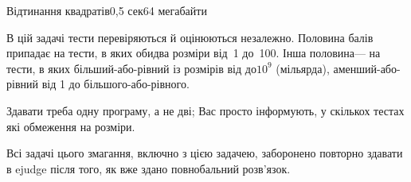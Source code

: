\begin{problem}{Відтинання квадратів}{\stdinOrInputTxt}{\stdoutOrOutputTxt}{0,5 сек}{64 мегабайти}
{\ifAfour
\Examples
\begin{exampleSimpleExtraNarrow}{2.5em}{3em}
\exmpI%
\end{exampleSimpleExtraNarrow}
\begin{exampleSimpleExtraNarrow}{2.5em}{3em}
\exmpII%
\end{exampleSimpleExtraNarrow}
\begin{exampleSimpleExtraNarrow}{2.5em}{3em}
\exmpIII%
\end{exampleSimpleExtraNarrow}
\par
\mytextandpicture{\Notes\squaresCutsNotePhrase}{\squaresCutsPicture}\par\vspace{-0.25\baselineskip}
\else
\noindent
\begin{minipage}{11em}
\hspace*{\mytemplen}\Examples\par
\begin{exampleSimple}{5em}{5em}
\exmpI%
\exmpII%
\exmpIII%
\end{exampleSimple}
\end{minipage}
\begin{minipage}{21em}
\squaresCutsNotePhrase
\end{minipage}
\squaresCutsPicture
\fi


}

\Scoring
В цій задачі тести перевіряються й оцінюються незалежно.
Половина балів припадає на тести, в яких обидва розміри від~1 до~100.
Інша половина\nolinebreak[3] --- на тести, в яких більший-або-рівний із розмірів від до\nolinebreak[3] $10^9$ (мільярда), а\nolinebreak[3] менший-або-рівний від 1 до більшого-або-рівного.

Здавати треба одну програму, а не дві; Вас просто інформують, у скількох тестах які обмеження на розміри.

\ifStatementOnly
\vfill\par
Всі задачі цього змагання, включно з цією задачею, заборонено повторно здавати в ejudge після того, як вже здано повнобальний розв'язок.
\fi

\end{problem}
